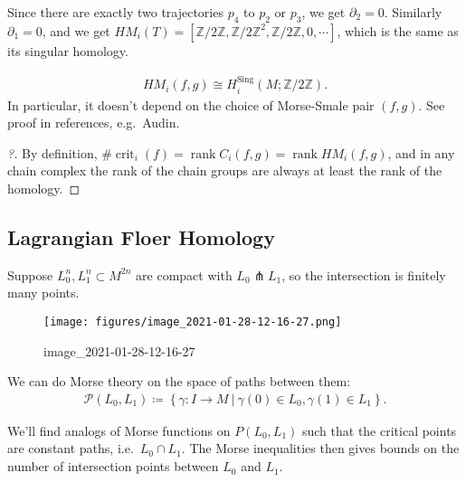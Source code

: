 \begin{example}
Since there are exactly two trajectories \(p_4\) to \(p_2\) or \(p_3\),
we get \({{\partial}}_2 = 0\). Similarly \({{\partial}}_1 = 0\), and we
get
\(HM_i(T) = [{\mathbb{Z}}/2{\mathbb{Z}}, {\mathbb{Z}}/2{\mathbb{Z}}^2, {\mathbb{Z}}/2{\mathbb{Z}}, 0, \cdots]\),
which is the same as its singular homology.

\end{example}

\begin{theorem}[?]

\begin{align*}
HM_i(f, g) \cong H_i^{{\operatorname{Sing}}}(M; {\mathbb{Z}}/2{\mathbb{Z}})
.\end{align*}
In particular, it doesn't depend on the choice of Morse-Smale pair
\((f, g)\). See proof in references, e.g.~Audin.

\end{theorem}

\begin{proof}[?]

By definition,
\(\# \operatorname{crit}_i(f) = \operatorname{rank}C_i(f, g) = \operatorname{rank}HM_i(f, g)\),
and in any chain complex the rank of the chain groups are always at
least the rank of the homology.

\end{proof}

\hypertarget{lagrangian-floer-homology-1}{%
\subsection{Lagrangian Floer
Homology}\label{lagrangian-floer-homology-1}}

Suppose \(L_0^n, L_1^n \subset M^{2n}\) are compact with
\(L_0 \pitchfork L_1\), so the intersection is finitely many points.

\begin{figure}
\centering
\texttt{[image: figures/image\_2021-01-28-12-16-27.png]}
\caption{image\_2021-01-28-12-16-27}
\end{figure}

We can do Morse theory on the space of paths between them:
\begin{align*}
\mathcal{P}(L_0, L_1) \coloneqq\left\{{ \gamma: I\to M {~\mathrel{\Big|}~}\gamma(0) \in L_0, \gamma(1) \in L_1}\right\}
.\end{align*}

We'll find analogs of Morse functions on \(P(L_0, L_1)\) such that the
critical points are constant paths, i.e.~\(L_0 \cap L_1\). The Morse
inequalities then gives bounds on the number of intersection points
between \(L_0\) and \(L_1\).

